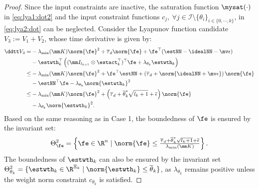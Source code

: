 \documentclass[letterpaper, journal]{IEEEtran}
\begin{document}
\begin{proof}
Since the input constraints are inactive, the saturation function $\mysat(\cdot)$ in \eqref{eq:lya1:dot2} and the input constraint functions $c_j,\ \forall j\in\mathcal I \setminus \{\theta_i\}_{i\in\{0,\cdots,k\}}$, in \eqref{eq:lya2:dot} can be neglected.
Consider the Lyapunov function candidate $V_3:=V_1+V_2$, whose time derivative is given by:
\begin{equation}
    \begin{aligned}
        \ddtt V_3
        =&
        -\lambda_{\min}(\mm K)\norm{\fe}^2
        +\overline\tau_d\norm{\fe}
        +\fe^\top (\estNN - \idealNN - \mv\epsilon)
        \\
        &
        -\estwth_k^\top 
        \left(
            (\mm I_{l_{k+1}}\otimes \estact_k^\top)^\top
            \fe
            +
            \lambda_{\theta_k}\estwth_k
        \right)
        \\
        \le&
        -\lambda_{\min}(\mm K)\norm{\fe}^2
        +\fe^\top \estNN
        +
        \left(
            \overline\tau_d+\norm{
                \idealNN+\mv\epsilon
            }
        \right)
        \norm{\fe}
        \\
        &
        -\estNN^\top\fe 
        -\lambda_{\theta_k}\norm{\estwth_k}^2
        \\
        \le&
        -
        \lambda_{\min}(\mm K)
        \norm{\fe}^2
        +
        \left(
            \overline\tau_d
            +
            \overline{\theta}^*_k\sqrt{l_{k}+1}
            +
            \overline{\epsilon}
        \right)
        \norm{\fe}
        \\
        &
        -
        \lambda_{\theta_k}\norm{\estwth_k}^2
        .
    \end{aligned}
    \label{eq:lya3:dot}
\end{equation}
Based on the same reasoning as in Case 1, the boundedness of $\fe$ is ensured by the invariant set:
\begin{equation}
    \Theta_{\fe}^{2}
    =
    \left\{ 
        \fe \in \R^n 
        \mid 
        \norm{\fe} 
        \le 
        \tfrac{
            \overline\tau_d
            +
            \overline{\theta}^*_k\sqrt{l_{k}+1}
            +
            \overline{\epsilon}
        }{
            \lambda_{\min}(\mm K)
        }
    \right\}
    .
\end{equation}
The boundedness of $\estwth_k$ can also be ensured by the invariant set $\Theta_{\theta_k}^{2}=\{ \estwth_k \in \R^{\Xi_{k}} \mid \norm{\estwth_k} \le \overline\theta_k \}$, as $\lambda_{\theta_k}$ remains positive unless the weight norm constraint $c_{\theta_k}$ is satisfied.


\end{proof}
\end{document}

